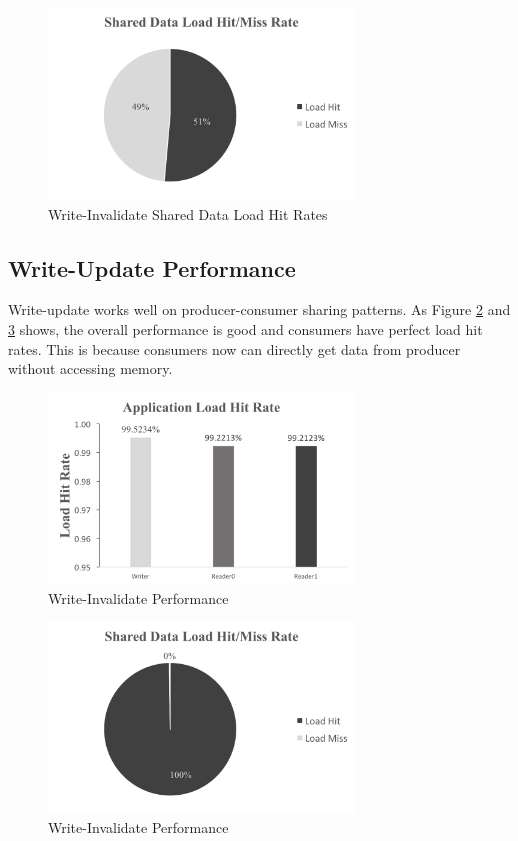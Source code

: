 \documentclass[11pt,conference]{IEEEtran}
\begin{document}
\begin{figure}[!h]
\centering
\includegraphics[width=3.2in]{write_invalidate_1.png}
\caption{Write-Invalidate Shared Data Load Hit Rates}
\label{write_invalidate_1}
\end{figure}
\FloatBarrier


\subsection{Write-Update Performance}
Write-update works well on producer-consumer sharing patterns. As Figure \ref{write_update} and \ref{write_update_1} shows, the overall performance is good and consumers have perfect load hit rates. This is because consumers now can directly get data from producer without accessing memory.

\begin{figure}[!h]
\centering
\includegraphics[width=3.2in]{write_update.png}
\caption{Write-Invalidate Performance}
\label{write_update}
\end{figure}
\FloatBarrier

\begin{figure}[!h]
\centering
\includegraphics[width=3.2in]{write_update_1.png}
\caption{Write-Invalidate Performance}
\label{write_update_1}
\end{figure}
\FloatBarrier
\end{document}
